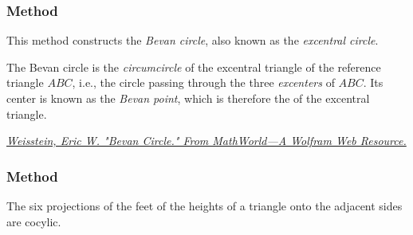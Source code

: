 \subsubsection{Method    } %
\label{ssub:methods_triangle_bevan_circle}

This method constructs the \emph{Bevan circle}, also known as the \emph{excentral circle}.

The Bevan circle is the \emph{circumcircle} of the excentral triangle of the reference triangle \( ABC \), i.e., the circle passing through the three \emph{excenters} of \( ABC \). Its center is known as the \emph{Bevan point}, which is therefore the  of the excentral triangle.
\begin{flushright}
\small
\href{https://mathworld.wolfram.com/BevanCircle.html}
{\textit{Weisstein, Eric W. "Bevan Circle." From MathWorld—A Wolfram Web Resource.}}
\end{flushright}

\vspace{1em}
\begin{tkzexample}[latex=.5\textwidth]
\begin{center}
    \end{center}
\end{tkzexample}

\subsubsection{Method } %
\label{ssub:method_triangle_taylor__circle}

The six projections of the feet of the heights of a triangle onto the adjacent sides are cocylic.


